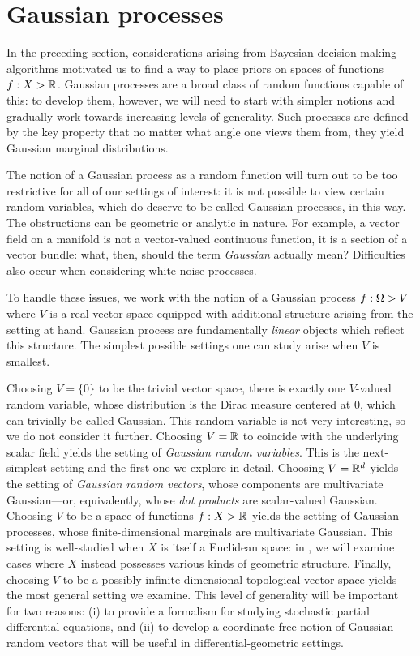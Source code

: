 \documentclass[11pt]{book}
\begin{document}
\section{Gaussian processes}

In the preceding section, considerations arising from Bayesian decision-making algorithms motivated us to find a way to place priors on spaces of functions $f : X \-> \mathbb{R}$.
Gaussian processes are a broad class of random functions capable of this: to develop them, however, we will need to start with simpler notions and gradually work towards increasing levels of generality.
Such processes are defined by the key property that no matter what angle one views them from, they yield Gaussian marginal distributions.

The notion of a Gaussian process as a random function will turn out to be too restrictive for all of our settings of interest: it is not possible to view certain random variables, which do deserve to be called Gaussian processes, in this way.
The obstructions can be geometric or analytic in nature.
For example, a vector field on a manifold is not a vector-valued continuous function, it is a section of a vector bundle: what, then, should the term \emph{Gaussian} actually mean?
Difficulties also occur when considering white noise processes.

To handle these issues, we work with the notion of a Gaussian process $f : \Omega \-> V$ where $V$ is a real vector space equipped with additional structure arising from the setting at hand.
Gaussian process are fundamentally \emph{linear} objects which reflect this structure.
The simplest possible settings one can study arise when $V$ is smallest.

\1  Choosing $V = \{0\}$ to be the trivial vector space, there is exactly one $V$-valued random variable, whose distribution is the Dirac measure centered at $0$, which can trivially be called Gaussian.
This random variable is not very interesting, so we do not consider it further.
\2 Choosing $V = \mathbb{R}$ to coincide with the underlying scalar field yields the setting of \emph{Gaussian random variables}.
This is the next-simplest setting and the first one we explore in detail.
\3 Choosing $V = \mathbb{R}^d$ yields the setting of \emph{Gaussian random vectors}, whose components are multivariate Gaussian---or, equivalently, whose \emph{dot products} are scalar-valued Gaussian.
\4 Choosing $V$ to be a space of functions $f : X \-> \mathbb{R}$ yields the setting of Gaussian processes, whose finite-dimensional marginals are multivariate Gaussian.
This setting is well-studied when $X$ is itself a Euclidean space: in , we will examine cases where $X$ instead possesses various kinds of geometric structure.
\5 Finally, choosing $V$ to be a possibly infinite-dimensional topological vector space yields the most general setting we examine.
This level of generality will be important for two reasons: (i) to provide a formalism for studying stochastic partial differential equations, and (ii) to develop a coordinate-free notion of Gaussian random vectors that will be useful in differential-geometric settings.
\0 
\end{document}
